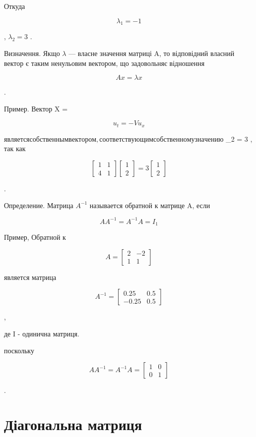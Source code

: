 \documentclass[
  ukrainian,
]{article}
\begin{document}
Откуда

\[
\lambda_1 = -1
\]

, \(\lambda_2 = 3\) .

Визначення. Якщо \(\lambda\) --- власне значення матриці A, то
відповідний власний вектор є таким ненульовим вектором, що задовольняє
відношення

\[
Ax = \lambda x
\]

.

Пример. Вектор X =

\[
u_t = -Vu_x
\]

\(является собственным вектором, соответствующим собственному значению\)
\lambda\_2 = 3 , так как

\[
\begin{bmatrix} 1 & 1 \\ 4 & 1 \end{bmatrix}
\begin{bmatrix} 1 \\ 2 \end{bmatrix}
= 3
\begin{bmatrix} 1 \\ 2 \end{bmatrix}
\]

.

Определение. Матрица \(A^{-1}\) называется обратной к матрице A, если

\[
AA^{-1} = A^{-1}A = I_1
\]

Пример, Обратной к

\[
A =
\begin{bmatrix} 2 & -2 \\ 1 & 1 \end{bmatrix}
\]

является матрица

\[
A^{-1} =
\begin{bmatrix} 0.25 & 0.5 \\ -0.25 & 0.5 \end{bmatrix}
\]

,

де I - одинична матриця.

поскольку

\[
AA^{-1} = A^{-1}A =
\begin{bmatrix} 1 & 0 \\ 0 & 1 \end{bmatrix}
\]

.

\section{Діагональна
матриця}\label{ux434ux456ux430ux433ux43eux43dux430ux43bux44cux43dux430-ux43cux430ux442ux440ux438ux446ux44f}
\end{document}
